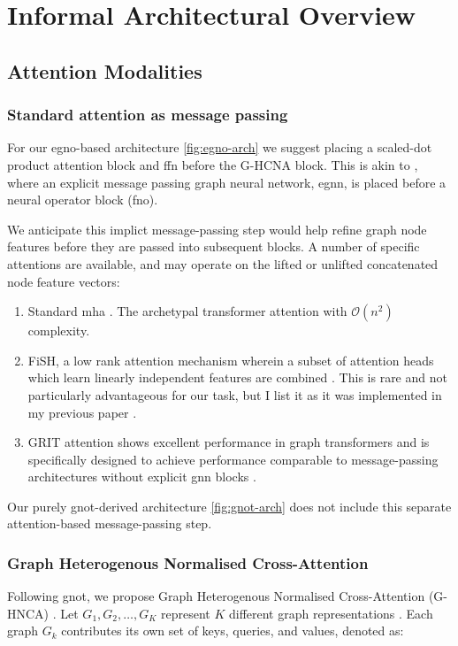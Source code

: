 \documentclass{article}
\begin{document}
\section{Informal Architectural Overview}
\label{sec:headings}
\subsection{Attention Modalities}
\subsubsection{Standard attention as message passing}
For our \gls{egno}-based architecture \eqref{fig:egno-arch} we suggest placing a scaled-dot product attention block and \gls{ffn} before the G-HCNA block. This is akin to \textcite{xu_equivariant_2024}, where an explicit message passing graph neural network, \gls{egnn}, is placed before a neural operator block (\gls{fno}).

We anticipate this implict message-passing step would help refine graph node features before they are passed into subsequent blocks. A number of specific attentions are available, and may operate on the lifted or unlifted concatenated node feature vectors:
\begin{enumerate}
    \item Standard \gls{mha} \cite{vaswani_attention_2017}. The archetypal transformer attention with $\mathcal{O}(n^2)$ complexity.
    \item FiSH, a low rank attention mechanism wherein a subset of attention heads which learn linearly independent features are combined \cite{nguyen_improving_2022}. This is rare and not particularly advantageous for our task, but I list it as it was implemented in my previous paper \cite{thompson_amesformer_2024}.
    \item GRIT attention shows excellent performance in graph transformers and is specifically designed to achieve performance comparable to message-passing architectures without explicit \gls{gnn} blocks \cite{ma_graph_2023}.
\end{enumerate}

Our purely \gls{gnot}-derived architecture \eqref{fig:gnot-arch} does not include this separate attention-based message-passing step.

\subsubsection{Graph Heterogenous Normalised Cross-Attention}
Following \gls{gnot}, we propose Graph Heterogenous Normalised Cross-Attention (G-HNCA) \cite{hao_gnot_2023}. Let \( G_1, G_2, \dots, G_K \) represent \( K \) different graph representations \cite{hao_gnot_2023}. Each graph \( G_k \) contributes its own set of keys, queries, and values, denoted as:
\end{document}
